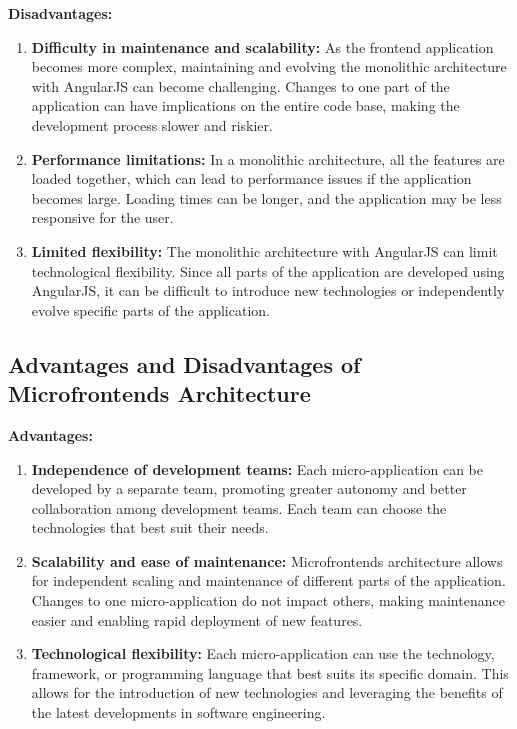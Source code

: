 \textbf{Disadvantages:}
\begin{enumerate}
\item \textbf{Difficulty in maintenance and scalability:} As the frontend application becomes more complex, maintaining and evolving the monolithic architecture with AngularJS can become challenging. Changes to one part of the application can have implications on the entire code base, making the development process slower and riskier.
\item \textbf{Performance limitations:} In a monolithic architecture, all the features are loaded together, which can lead to performance issues if the application becomes large. Loading times can be longer, and the application may be less responsive for the user.
\item \textbf{Limited flexibility:} The monolithic architecture with AngularJS can limit technological flexibility. Since all parts of the application are developed using AngularJS, it can be difficult to introduce new technologies or independently evolve specific parts of the application.
\end{enumerate}

\subsection{Advantages and Disadvantages of Microfrontends Architecture}
\textbf{Advantages:}
\begin{enumerate}
\item \textbf{Independence of development teams:} Each micro-application can be developed by a separate team, promoting greater autonomy and better collaboration among development teams. Each team can choose the technologies that best suit their needs.
\item \textbf{Scalability and ease of maintenance:} Microfrontends architecture allows for independent scaling and maintenance of different parts of the application. Changes to one micro-application do not impact others, making maintenance easier and enabling rapid deployment of new features.
\item \textbf{Technological flexibility:} Each micro-application can use the technology, framework, or programming language that best suits its specific domain. This allows for the introduction of new technologies and leveraging the benefits of the latest developments in software engineering.
\end{enumerate}

